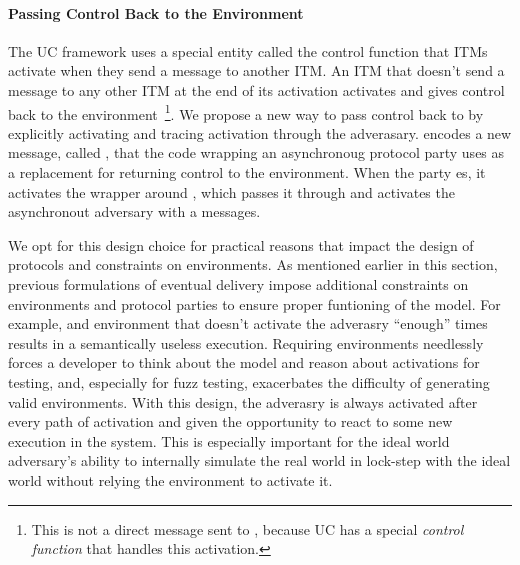 \paragraph{Passing Control Back to the Environment}
The UC framework uses a special entity called the control function that ITMs activate when they send a message to another ITM.
An ITM that doesn't send a message to any other ITM at the end of its activation activates and gives control back to the environment~\footnote{This is not a direct message sent to \Z, because UC has a special \emph{control function} that handles this activation.}.
We propose a new way to pass control back to \Z by explicitly activating \fwrapper and tracing activation through the adverasary.
\fwrapper encodes a new message, called , that the code wrapping an asynchronoug protocol party uses as a replacement for returning control to the environment. 
When the party es, it activates the wrapper around \F, which passes it through and activates the asynchronout adversary with a  messages.

We opt for this design choice for practical reasons that impact the design of protocols and constraints on environments.
As mentioned earlier in this section, previous formulations of eventual delivery impose additional constraints on environments and protocol parties to ensure proper funtioning of the model.
For example, and environment that doesn't activate the adverasry ``enough'' times results in a semantically useless execution. 
Requiring environments needlessly forces a developer to think about the model and reason about activations for testing, and, especially for fuzz testing, exacerbates the difficulty of generating valid environments.
With this design, the adverasry is always activated after every path of activation and given the opportunity to react to some new execution in the system.
This is especially important for the ideal world adversary's ability to internally simulate the real world in lock-step with the ideal world without relying the environment to activate it. 

